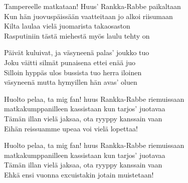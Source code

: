 Tampereelle matkataan! Huus’ Rankka-Rabbe paikaltaan\\
Kun hän juovuspäissään vaatteitaan jo alkoi riisumaan\\
Kilta laulaa vielä juomarista takaosaston\\
Rasputiniin tästä miehestä myös laulu tehty on

Päivät kuluivat, ja väsyneenä palas’ joukko tuo\\
Joku väitti silmät punaisena ettei enää juo\\
Silloin hyppäs ulos bussista tuo herra iloinen\\
väsyneenä mutta hymyillen hän avas’ oluen

Huolto pelaa, ta mig fan! huus Rankka-Rabbe riemuissaan\\
matkakumppanilleen kassistaan kun tarjos’ juotavaa\\
Tämän illan vielä jaksaa, ota ryyppy kanssain vaan\\
Eihän reissuamme upeaa voi vielä lopettaa!

Huolto pelaa, ta mig fan! huus Rankka-Rabbe riemuissaan\\
matkakumppanilleen kassistaan kun tarjos’ juotavaa\\
Tämän illan vielä jaksaa, ota ryyppy kanssain vaan\\
Ehkä ensi vuonna excuistakin jotain muistetaan!